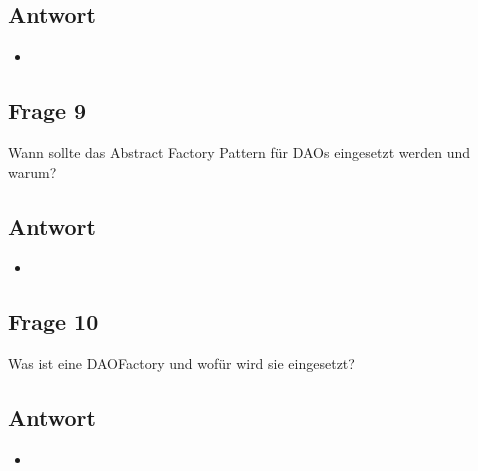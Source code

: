 \subsection*{Antwort}
\begin{itemize}
	\item 
\end{itemize}

\subsection*{Frage 9}
Wann sollte das Abstract Factory Pattern für DAOs eingesetzt werden und warum?
\subsection*{Antwort}
\begin{itemize}
	\item 
\end{itemize}

\subsection*{Frage 10}
Was ist eine DAOFactory und wofür wird sie eingesetzt?
\subsection*{Antwort}
\begin{itemize}
	\item 
\end{itemize}

